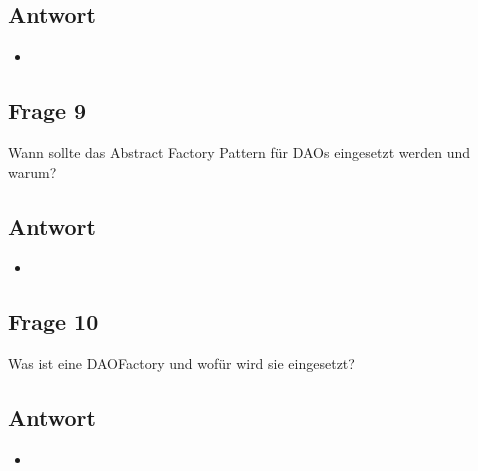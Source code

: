 \subsection*{Antwort}
\begin{itemize}
	\item 
\end{itemize}

\subsection*{Frage 9}
Wann sollte das Abstract Factory Pattern für DAOs eingesetzt werden und warum?
\subsection*{Antwort}
\begin{itemize}
	\item 
\end{itemize}

\subsection*{Frage 10}
Was ist eine DAOFactory und wofür wird sie eingesetzt?
\subsection*{Antwort}
\begin{itemize}
	\item 
\end{itemize}

